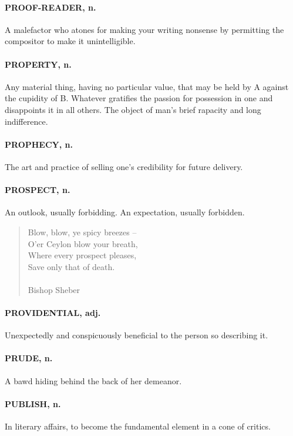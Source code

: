 \documentclass[11pt]{article}
\begin{document}
\paragraph{PROOF-READER, n.}  A malefactor who atones for making your writing
nonsense by permitting the compositor to make it unintelligible.

\paragraph{PROPERTY, n.}  Any material thing, having no particular value, that may
be held by A against the cupidity of B.  Whatever gratifies the
passion for possession in one and disappoints it in all others.  The
object of man's brief rapacity and long indifference.

\paragraph{PROPHECY, n.}  The art and practice of selling one's credibility for
future delivery.

\paragraph{PROSPECT, n.}  An outlook, usually forbidding.  An expectation, usually
forbidden.

\begin{quote}   Blow, blow, ye spicy breezes -- \\
      O'er Ceylon blow your breath, \\
  Where every prospect pleases, \\
      Save only that of death. \\
 \\
Bishop Sheber \end{quote}


\paragraph{PROVIDENTIAL, adj.}  Unexpectedly and conspicuously beneficial to the
person so describing it.

\paragraph{PRUDE, n.}  A bawd hiding behind the back of her demeanor.

\paragraph{PUBLISH, n.}  In literary affairs, to become the fundamental element in
a cone of critics.
\end{document}
